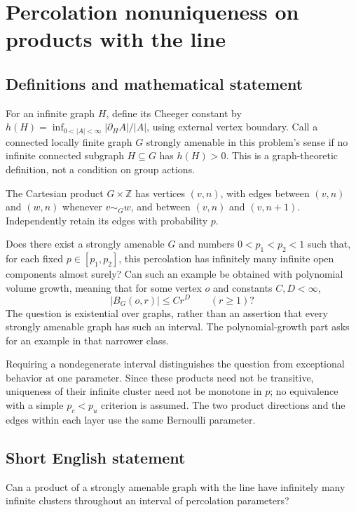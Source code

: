 \documentclass[11pt,a4paper]{article}
\begin{document}
\section*{Percolation nonuniqueness on products with the line}\label{statement}

\subsection{Definitions and mathematical statement}
For an infinite graph $H$, define its Cheeger constant by $h(H)=\inf_{0<|A|<\infty}|\partial_H A|/|A|$, using external vertex boundary. Call a connected locally finite graph $G$ strongly amenable in this problem's sense if no infinite connected subgraph $H\subseteq G$ has $h(H)>0$. This is a graph-theoretic definition, not a condition on group actions.

The Cartesian product $G\times\mathbb Z$ has vertices $(v,n)$, with edges between $(v,n)$ and $(w,n)$ whenever $v\sim_Gw$, and between $(v,n)$ and $(v,n+1)$. Independently retain its edges with probability $p$.

Does there exist a strongly amenable $G$ and numbers $0<p_1<p_2<1$ such that, for each fixed $p\in[p_1,p_2]$, this percolation has infinitely many infinite open components almost surely? Can such an example be obtained with polynomial volume growth, meaning that for some vertex $o$ and constants $C,D<\infty$,
\[
|B_G(o,r)|\le Cr^D\qquad(r\ge1)?
\]
The question is existential over graphs, rather than an assertion that every strongly amenable graph has such an interval. The polynomial-growth part asks for an example in that narrower class.

Requiring a nondegenerate interval distinguishes the question from exceptional behavior at one parameter. Since these products need not be transitive, uniqueness of their infinite cluster need not be monotone in $p$; no equivalence with a simple $p_c<p_u$ criterion is assumed. The two product directions and the edges within each layer use the same Bernoulli parameter.
\subsection{Short English statement}
Can a product of a strongly amenable graph with the line have infinitely many infinite clusters throughout an interval of percolation parameters?
\end{document}
